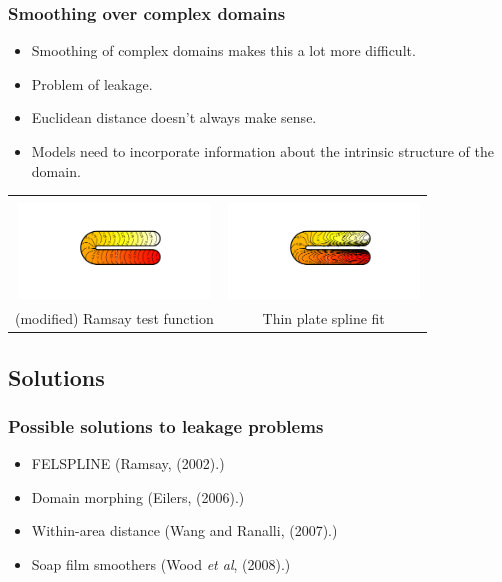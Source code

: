 \documentclass[ignorenonframetext]{beamer} %
\newcommand{\bc}{\begin{center}}
\newcommand{\ec}{\end{center}}
\newcommand{\bi}{\begin{itemize}}
\newcommand{\ei}{\end{itemize}}
\begin{document}
\begin{frame}
	\frametitle{Smoothing over complex domains}
       \bi
         \item Smoothing of complex domains makes this a lot more difficult.
         \item Problem of leakage.
         \item Euclidean distance doesn't always make sense.
         \item Models need to incorporate information about the intrinsic structure of the domain.
       \ei
       \bc\begin{tabular}{@{}cc}
          & \\
          \includegraphics[width=2in, trim=1in 1in 1in 1in]{figs/ramsayhorseshoe} & \includegraphics[width=2in, trim=1in 1in 1in 1in]{figs/leakageexample}\\
          (modified) Ramsay test function & Thin plate spline fit\\
       \end{tabular}\ec
\end{frame}

\subsection{Solutions}

\begin{frame}
	\frametitle{Possible solutions to leakage problems}
       \bi
         \item FELSPLINE (Ramsay, (2002).)
         \item Domain morphing (Eilers, (2006).)
         \item Within-area distance (Wang and Ranalli, (2007).)
         \item Soap film smoothers (Wood \emph{et al}, (2008).) 
        \ei
\end{frame}
\end{document}
